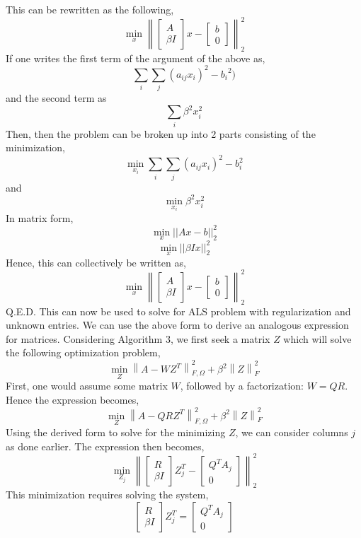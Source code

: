 \documentclass{article}
\begin{document}
This can be rewritten as the following, 
$$ \min_x \left\|\begin{bmatrix}A \\ \beta I\end{bmatrix}x-\begin{bmatrix}b \\ 0\end{bmatrix}\right\|_2^2 $$
If one writes the first term of the argument of the above as,
$$ \sum_{i}\sum_{j} (a_{ij}x_{i})^{2} - {b_{i}}^2) $$     
and the second term as 
$$\sum_{i} \beta^2 x_{i}^2$$ 
Then, then the problem can be broken up into 2 parts  consisting of the minimization, 
$$ \min_{x_{i}} \sum_{i}\sum_{j} (a_{ij}x_{i})^{2} - b_{i}^{2} $$
and 
$$ \min_{x_{i}}\beta^2 x_{i}^{2}$$
In matrix form, 
$$ \min_{x} ||Ax - b||_{2}^{2} $$  
$$  \min_{x} ||\beta Ix ||_{2}^{2} $$     
Hence, this can collectively be written as, 
$$ \min_x \left\|\begin{bmatrix}A \\ \beta I\end{bmatrix}x-\begin{bmatrix}b \\ 0\end{bmatrix}\right\|_2^2 $$
Q.E.D. 
This can now be used to solve for ALS problem with regularization and unknown entries. We can use the above form to derive an analogous expression for matrices. Considering Algorithm 3,  we first seek a matrix $Z$ which will solve the following optimization problem, 
$$\min_{Z}\left\|A - WZ^T\right\|^2_{F,\Omega} + \beta^2\left\|Z\right\|_F^2$$    
First, one would assume some matrix $W$, followed by a factorization: $W =QR$. Hence the expression becomes,  
$$ \min_{Z}\left\|A -QRZ^T\right\|^2_{F,\Omega} + \beta^2\left\|Z\right\|_F^2$$     
Using the derived form to solve for the minimizing $Z$,  we can consider columns $j$ as done earlier. The expression then becomes, 
$$   \min_{Z_{j}} \left\|\begin{bmatrix}R \\ \beta I\end{bmatrix}Z_{j}^{T}-\begin{bmatrix} Q^{T}A_{j}\\ 0\end{bmatrix}\right\|_2^2
 $$ 
 This minimization requires solving the system, 
$$  \begin{bmatrix}R \\ \beta I\end{bmatrix}Z_{j}^{T}=\begin{bmatrix} Q^{T}A_{j}\\ 0\end{bmatrix}
 $$ 
\end{document}
